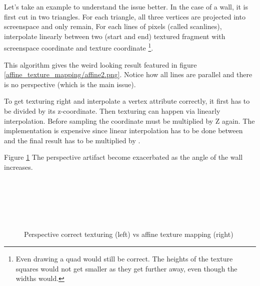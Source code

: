Let's take an example to understand the issue better. In the case of a wall, it is first cut in two triangles. For each triangle, all three vertices  are projected into screenspace and only  remain, For each lines of pixels (called scanlines), interpolate linearly between two (start and end) textured fragment with screenspace coordinate  and texture coordinate \footnote{ Even drawing a quad would still be correct. The heights of the texture squares would not get smaller as they get further away, even though the widths would.}.\\
\par
This algorithm gives the weird looking result featured in figure \ref{affine_texture_mapping/affine2.png}. Notice how all lines are parallel and there is no perspective (which is the main issue).\\
\par
{}
\par
To get texturing right and interpolate a vertex attribute correctly, it first has to be divided by its z-coordinate. Then texturing can happen via linearly interpolation. Before sampling the coordinate must be multiplied by Z again. The implementation is expensive since linear interpolation has to be done between  and the final result has to be multiplied by .\\
\par
Figure \ref{texture_anmgle} The perspective artifact become exacerbated as the angle of the wall increases.\\ 
\pagebreak




\par
\begin{figure}[H] \centering
\begin{minipage}{\textwidth}
 \hspace{2cm}
\\
\par

 \hspace{2cm}
\\
\par

 \hspace{2cm}
\\
\par
\end{minipage}
\caption{Perspective correct texturing (left) vs affine texture mapping (right)}
\label{texture_anmgle}
\end{figure}
\par

